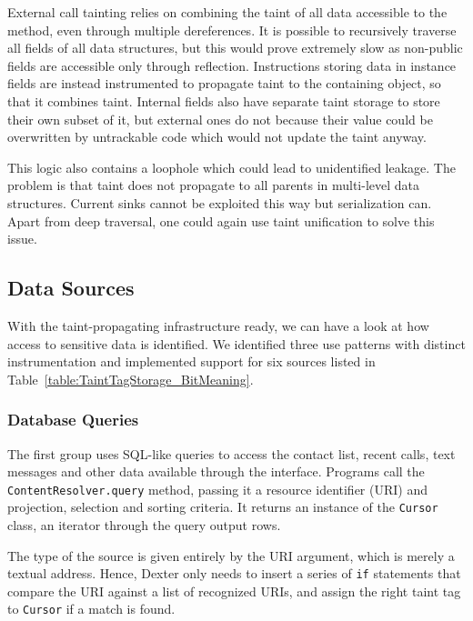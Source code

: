 \documentclass[12pt,twoside,notitlepage]{report}
\begin{document}
External call tainting relies on combining the taint of all data accessible to the method, even through multiple dereferences. It is possible to recursively traverse all fields of all data structures, but this would prove extremely slow as non-public fields are accessible only through reflection. Instructions storing data in instance fields are instead instrumented to propagate taint to the containing object, so that it combines taint. Internal fields also have separate taint storage to store their own subset of it, but external ones do not because their value could be overwritten by untrackable code which would not update the taint anyway.

This logic also contains a loophole which could lead to unidentified leakage. The problem is that taint does not propagate to all parents in multi-level data structures. Current sinks cannot be exploited this way but serialization can. Apart from deep traversal, one could again use taint unification to solve this issue.

\subsection{Data Sources}

With the taint-propagating infrastructure ready, we can have a look at how access to sensitive data is identified. We identified three use patterns with distinct instrumentation and implemented support for six sources listed in Table~\ref{table:TaintTagStorage_BitMeaning}.

\subsubsection{Database Queries}

The first group uses SQL-like queries to access the contact list, recent calls, text messages and other data available through the interface. Programs call the \verb$ContentResolver.query$ method, passing it a resource identifier (URI) and projection, selection and sorting criteria. It returns an instance of the \verb$Cursor$ class, an iterator through the query output rows. 

The type of the source is given entirely by the URI argument, which is merely a textual address. Hence, Dexter only needs to insert a series of \verb$if$ statements that compare the URI against a list of recognized URIs, and assign the right taint tag to \verb$Cursor$ if a match is found.
\end{document}

